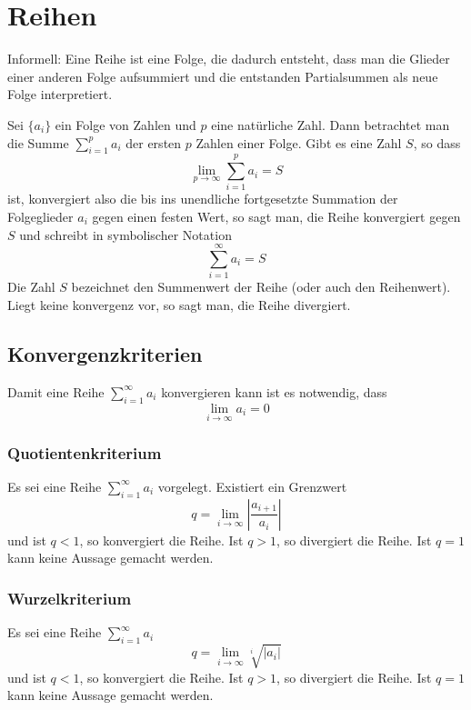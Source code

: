 \vfill
\section{Reihen}
Informell: Eine Reihe ist eine Folge, die dadurch entsteht, dass man die Glieder einer anderen Folge aufsummiert und die entstanden Partialsummen als neue Folge interpretiert.

Sei $\{a_i\}$ ein Folge von Zahlen und $p$ eine natürliche Zahl. Dann betrachtet man die Summe $\sum_{i=1}^{p} a_i$
der ersten $p$ Zahlen einer Folge. Gibt es eine Zahl $S$, so dass
\begin{equation*}
	\lim_{p \rightarrow \infty} \sum_{i = 1}^{p} a_i = S
\end{equation*}
ist, konvergiert also die bis ins unendliche fortgesetzte Summation der Folgeglieder $a_i$ gegen einen festen Wert, so sagt man, die
Reihe konvergiert gegen $S$ und schreibt in symbolischer Notation
\begin{equation*}
	\sum_{i = 1}^{\infty} a_i = S
\end{equation*}
Die Zahl $S$ bezeichnet den Summenwert der Reihe (oder auch den Reihenwert). Liegt keine konvergenz vor, so sagt man, die Reihe divergiert.

\subsection{Konvergenzkriterien}
Damit eine Reihe $\sum_{i = 1}^{\infty} a_i$ konvergieren kann ist es notwendig, dass
\begin{equation*}
	\lim_{i \rightarrow \infty} a_i = 0
\end{equation*}


\subsubsection{Quotientenkriterium}
Es sei eine Reihe $	\sum_{i=1}^{\infty} a_i$
vorgelegt. Existiert ein Grenzwert
\begin{equation*}
	q = \lim_{i \rightarrow \infty} \left| \frac{a_{i + 1}}{a_i} \right|
\end{equation*}
und ist $q < 1$, so konvergiert die Reihe. Ist $q > 1$, so divergiert die Reihe.
Ist $q = 1$ kann keine Aussage gemacht werden.

\subsubsection{Wurzelkriterium}
Es sei eine Reihe $\sum_{i=1}^{\infty} a_i$
\begin{equation*}
	q = \lim_{i \rightarrow \infty} \sqrt[i]{|a_i|}
\end{equation*}
und ist $q < 1$, so konvergiert die Reihe. Ist $q > 1$, so divergiert die Reihe.
Ist $q = 1$ kann keine Aussage gemacht werden.

